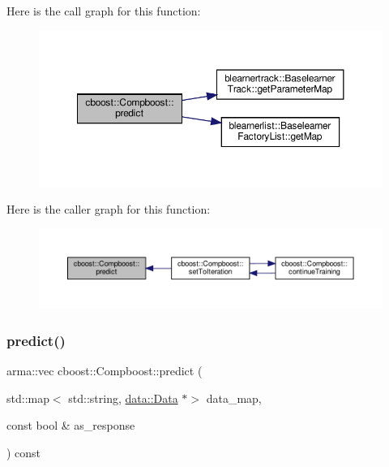 Here is the call graph for this function\+:
\nopagebreak
\begin{figure}[H]
\begin{center}
\leavevmode
\includegraphics[width=350pt]{classcboost_1_1_compboost_a32d1066a24607ff6ef2f934002adf62b_cgraph}
\end{center}
\end{figure}
Here is the caller graph for this function\+:
\nopagebreak
\begin{figure}[H]
\begin{center}
\leavevmode
\includegraphics[width=350pt]{classcboost_1_1_compboost_a32d1066a24607ff6ef2f934002adf62b_icgraph}
\end{center}
\end{figure}
\mbox{\label{classcboost_1_1_compboost_a51c59cdddec77c2bed757aadad6afe1d}} 
\subsubsection{\texorpdfstring{predict()}{predict()}\hspace{0.1cm}{\footnotesize\ttfamily [2/2]}}
{\footnotesize\ttfamily arma\+::vec cboost\+::\+Compboost\+::predict (\begin{DoxyParamCaption}\item[{std\+::map$<$ std\+::string, \hyperlink{classdata_1_1_data}{data\+::\+Data} $\ast$$>$}]{data\+\_\+map,  }\item[{const bool \&}]{as\+\_\+response }\end{DoxyParamCaption}) const}

